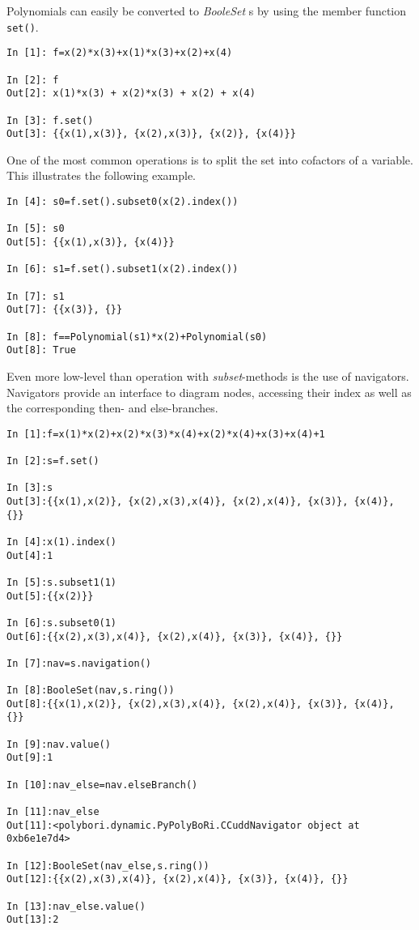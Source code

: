 \documentclass[]{article}
\newcommand{\functionname}[1]{\textit{#1}\xspace}
\begin{document}
Polynomials can easily be converted to \functionname{BooleSet}s by using the
member function \lstinline|set()|.
\begin{lstlisting}
In [1]: f=x(2)*x(3)+x(1)*x(3)+x(2)+x(4)

In [2]: f
Out[2]: x(1)*x(3) + x(2)*x(3) + x(2) + x(4)

In [3]: f.set()
Out[3]: {{x(1),x(3)}, {x(2),x(3)}, {x(2)}, {x(4)}}
\end{lstlisting}
%
One of the most common operations is to split the set into cofactors of a
variable. This illustrates the following example.
%
\begin{lstlisting}
In [4]: s0=f.set().subset0(x(2).index())

In [5]: s0
Out[5]: {{x(1),x(3)}, {x(4)}}

In [6]: s1=f.set().subset1(x(2).index())

In [7]: s1
Out[7]: {{x(3)}, {}}

In [8]: f==Polynomial(s1)*x(2)+Polynomial(s0)
Out[8]: True
\end{lstlisting}
%

Even more low-level than operation with \functionname{subset}-methods is the use
of navigators. Navigators  provide an interface to diagram nodes, accessing
their index as well as the corresponding then- and else-branches.

\begin{lstlisting}
In [1]:f=x(1)*x(2)+x(2)*x(3)*x(4)+x(2)*x(4)+x(3)+x(4)+1

In [2]:s=f.set()

In [3]:s
Out[3]:{{x(1),x(2)}, {x(2),x(3),x(4)}, {x(2),x(4)}, {x(3)}, {x(4)}, {}}

In [4]:x(1).index()
Out[4]:1

In [5]:s.subset1(1)
Out[5]:{{x(2)}}

In [6]:s.subset0(1)
Out[6]:{{x(2),x(3),x(4)}, {x(2),x(4)}, {x(3)}, {x(4)}, {}}

In [7]:nav=s.navigation()

In [8]:BooleSet(nav,s.ring())
Out[8]:{{x(1),x(2)}, {x(2),x(3),x(4)}, {x(2),x(4)}, {x(3)}, {x(4)}, {}}

In [9]:nav.value()
Out[9]:1

In [10]:nav_else=nav.elseBranch()

In [11]:nav_else
Out[11]:<polybori.dynamic.PyPolyBoRi.CCuddNavigator object at 0xb6e1e7d4>

In [12]:BooleSet(nav_else,s.ring())
Out[12]:{{x(2),x(3),x(4)}, {x(2),x(4)}, {x(3)}, {x(4)}, {}}

In [13]:nav_else.value()
Out[13]:2
\end{lstlisting}
\end{document}
